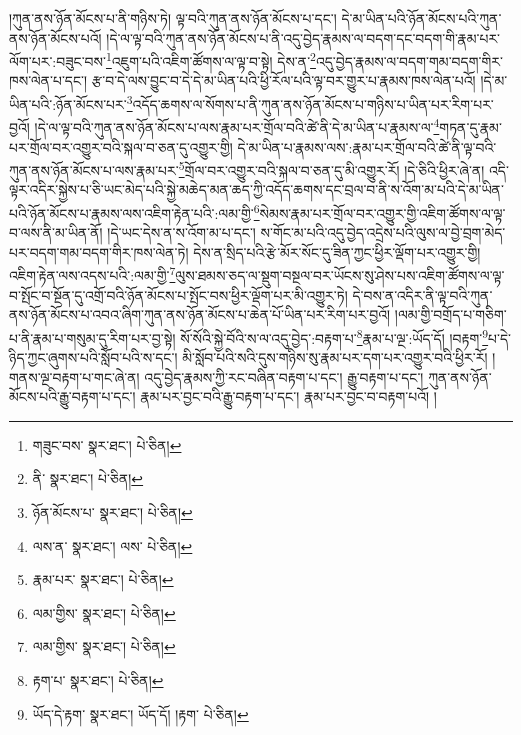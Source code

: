།ཀུན་ནས་ཉོན་མོངས་པ་ནི་གཉིས་ཏེ། ལྟ་བའི་ཀུན་ནས་ཉོན་མོངས་པ་དང་། དེ་མ་ཡིན་པའི་ཉོན་མོངས་པའི་ཀུན་ནས་ཉོན་མོངས་པའོ། །དེ་ལ་ལྟ་བའི་ཀུན་ནས་ཉོན་མོངས་པ་ནི་འདུ་བྱེད་རྣམས་ལ་བདག་དང་བདག་གི་རྣམ་པར་ལོག་པར་:བཟུང་བས་\footnote{གཟུང་བས་  སྣར་ཐང་།  པེ་ཅིན། }འཇུག་པའི་འཇིག་ཚོགས་ལ་ལྟ་བ་སྟེ། དེས་ན་\footnote{ནི་  སྣར་ཐང་།  པེ་ཅིན། }འདུ་བྱེད་རྣམས་ལ་བདག་གམ་བདག་གིར་ཁས་ལེན་པ་དང་། རྩ་བ་དེ་ལས་བྱུང་བ་དེ་དེ་མ་ཡིན་པའི་ཕྱི་རོལ་པའི་ལྟ་བར་གྱུར་པ་རྣམས་ཁས་ལེན་པའོ། །དེ་མ་ཡིན་པའི་:ཉོན་མོངས་པར་\footnote{ཉོན་མོངས་པ་  སྣར་ཐང་།  པེ་ཅིན། }འདོད་ཆགས་ལ་སོགས་པ་ནི་ཀུན་ནས་ཉོན་མོངས་པ་གཉིས་པ་ཡིན་པར་རིག་པར་བྱའོ། །དེ་ལ་ལྟ་བའི་ཀུན་ནས་ཉོན་མོངས་པ་ལས་རྣམ་པར་གྲོལ་བའི་ཚེ་ནི་དེ་མ་ཡིན་པ་རྣམས་ལ་\footnote{ལས་ན་  སྣར་ཐང་། ལས་  པེ་ཅིན། }གཏན་དུ་རྣམ་པར་གྲོལ་བར་འགྱུར་བའི་སྐལ་བ་ཅན་དུ་འགྱུར་གྱི། དེ་མ་ཡིན་པ་རྣམས་ལས་:རྣམ་པར་གྲོལ་བའི་ཚེ་ནི་ལྟ་བའི་ཀུན་ནས་ཉོན་མོངས་པ་ལས་རྣམ་པར་\footnote{རྣམ་པར་  སྣར་ཐང་།  པེ་ཅིན། }གྲོལ་བར་འགྱུར་བའི་སྐལ་བ་ཅན་དུ་མི་འགྱུར་རོ། །དེ་ཅིའི་ཕྱིར་ཞེ་ན། འདི་ལྟར་འདིར་སྐྱེས་པ་ཅི་ཡང་མེད་པའི་སྐྱེ་མཆེད་མན་ཆད་ཀྱི་འདོད་ཆགས་དང་བྲལ་བ་ནི་ས་འོག་མ་པའི་དེ་མ་ཡིན་པའི་ཉོན་མོངས་པ་རྣམས་ལས་འཇིག་རྟེན་པའི་:ལམ་གྱི་\footnote{ལམ་གྱིས་  སྣར་ཐང་།  པེ་ཅིན། }སེམས་རྣམ་པར་གྲོལ་བར་འགྱུར་གྱི་འཇིག་ཚོགས་ལ་ལྟ་བ་ལས་ནི་མ་ཡིན་ནོ། །དེ་ཡང་དེས་ན་ས་འོག་མ་པ་དང་། ས་གོང་མ་པའི་འདུ་བྱེད་འདྲེས་པའི་ལུས་ལ་བྱེ་བྲག་མེད་པར་བདག་གམ་བདག་གིར་ཁས་ལེན་ཏེ། དེས་ན་སྲིད་པའི་རྩེ་མོར་སོང་དུ་ཟིན་ཀྱང་ཕྱིར་ལྡོག་པར་འགྱུར་གྱི། འཇིག་རྟེན་ལས་འདས་པའི་:ལམ་གྱི་\footnote{ལམ་གྱིས་  སྣར་ཐང་།  པེ་ཅིན། }ལུས་ཐམས་ཅད་ལ་སྡུག་བསྔལ་བར་ཡོངས་སུ་ཤེས་པས་འཇིག་ཚོགས་ལ་ལྟ་བ་སྤོང་བ་སྔོན་དུ་འགྲོ་བའི་ཉོན་མོངས་པ་སྤོང་བས་ཕྱིར་ལྡོག་པར་མི་འགྱུར་ཏེ། དེ་བས་ན་འདིར་ནི་ལྟ་བའི་ཀུན་ནས་ཉོན་མོངས་པ་འབའ་ཞིག་ཀུན་ནས་ཉོན་མོངས་པ་ཆེན་པོ་ཡིན་པར་རིག་པར་བྱའོ། །ལམ་གྱི་བགྲོད་པ་གཅིག་པ་ནི་རྣམ་པ་གསུམ་དུ་རིག་པར་བྱ་སྟེ། སོ་སོའི་སྐྱེ་བོའི་ས་ལ་འདུ་བྱེད་:བརྟག་པ་\footnote{རྟག་པ་  སྣར་ཐང་།  པེ་ཅིན། }རྣམ་པ་ལྔ་:ཡོད་དོ། །བརྟག་\footnote{ཡོད་དེ་རྟག་  སྣར་ཐང་། ཡོད་དོ། །རྟག་  པེ་ཅིན། }པ་དེ་ཉིད་ཀྱང་ཞུགས་པའི་སློབ་པའི་ས་དང་། མི་སློབ་པའི་སའི་དུས་གཉིས་སུ་རྣམ་པར་དག་པར་འགྱུར་བའི་ཕྱིར་རོ། །གནས་ལྔ་བརྟག་པ་གང་ཞེ་ན། འདུ་བྱེད་རྣམས་ཀྱི་རང་བཞིན་བརྟག་པ་དང་། རྒྱུ་བརྟག་པ་དང་། ཀུན་ནས་ཉོན་མོངས་པའི་རྒྱུ་བརྟག་པ་དང་། རྣམ་པར་བྱང་བའི་རྒྱུ་བརྟག་པ་དང་། རྣམ་པར་བྱང་བ་བརྟག་པའོ། །
